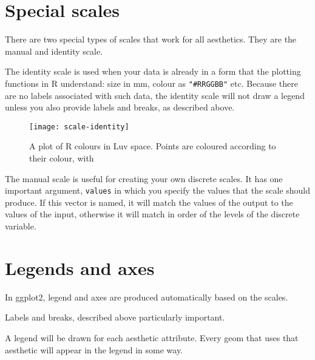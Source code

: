 \section{Special scales}

There are two special types of scales that work for all aesthetics.  They are the manual and identity scale.  

The identity scale is used when your data is already in a form that the plotting functions in R understand: size in mm, colour as \verb|"#RRGGBB"| etc. Because there are no labels associated with such data, the identity scale will not draw a legend unless you also provide labels and breaks, as described above. 

\begin{figure}[htbp]
  \centering
    \texttt{[image: scale-identity]}
  \caption{A plot of R colours in Luv space.  Points are coloured according to their colour, with }
  \label{fig:scale-identity}
\end{figure}

The manual scale is useful for creating your own discrete scales.  It has one important argument, \verb|values| in which you specify the values that the scale should produce.  If this vector is named, it will match the values of the output to the values of the input, otherwise it will match in order of the levels of the discrete variable.


\section{Legends and axes}
\label{sec:legends_and_axes}

In ggplot2, legend and axes are produced automatically based on the scales.

Labels and breaks, described above particularly important.

A legend will be drawn for each aesthetic attribute.  Every geom that uses that aesthetic will appear in the legend in some way.

